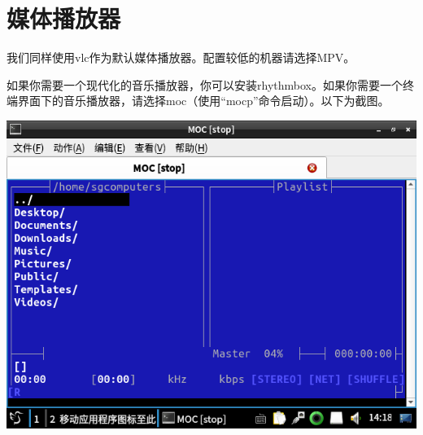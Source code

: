 \documentclass{book}
\begin{document}
\section{媒体播放器}
我们同样使用vlc作为默认媒体播放器。配置较低的机器请选择MPV。\par
如果你需要一个现代化的音乐播放器，你可以安装rhythmbox。如果你需要一个终端界面下的音乐播放器，请选择moc（使用“mocp”命令启动）。以下为截图。
\begin{center}
	\includegraphics[scale=0.9]{pic/moc}
\end{center}
\end{document}
